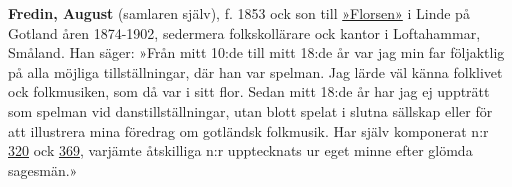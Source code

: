 \textbf{Fredin, August} (samlaren själv), f. 1853 ock son till \href{Florsen}{»Florsen»} i Linde på Gotland åren 1874-1902, sedermera folkskollärare ock kantor i Loftahammar, Småland. Han säger:
»Från mitt 10:de till mitt 18:de år var jag min far följaktlig på alla möjliga tillställningar, där han var spelman. Jag lärde väl känna folklivet ock folkmusiken, som då var i sitt flor. Sedan mitt 18:de år har jag ej uppträtt som spelman vid danstillställningar, utan blott spelat i slutna sällskap eller för att illustrera mina föredrag om gotländsk folkmusik. Har själv komponerat n:r \href{320}{320} ock \href{369}{369}, varjämte åtskilliga n:r upptecknats ur eget minne efter glömda sagesmän.» 
